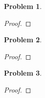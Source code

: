 \documentclass[10pt]{article}
\newcommand{\sk}{\vskip 10mm}
\theoremstyle{plain}
\newtheorem{problem}{Problem}
\theoremstyle{remark}
\begin{document}
\sk

\begin{problem} %
  
\end{problem}

\begin{proof}
  
\end{proof}

\sk

\begin{problem} %
  
\end{problem}

\begin{proof}
  
\end{proof}

\sk

\begin{problem} %
  
\end{problem}

\begin{proof}
  
\end{proof}
  
\end{document}
